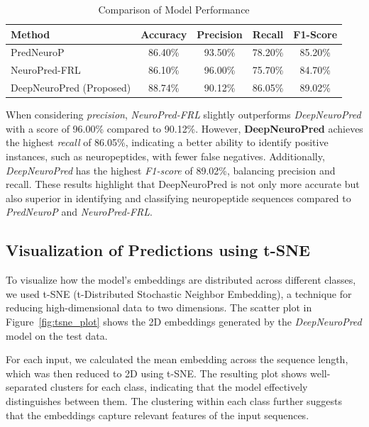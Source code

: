 \documentclass[conference]{IEEEtran}
\begin{document}
\begin{table}[h]
\centering
\renewcommand{\arraystretch}{1.5}
\begin{tabular}{lcccc}
\hline
\textbf{Method}      & \textbf{Accuracy} & \textbf{Precision} & \textbf{Recall} & \textbf{F1-Score} \\ \hline
PredNeuroP           & 86.40\%           & 93.50\%            & 78.20\%         & 85.20\%           \\
NeuroPred-FRL        & 86.10\%           & 96.00\%            & 75.70\%         & 84.70\%           \\
DeepNeuroPred (Proposed) & 88.74\%           & 90.12\%            & 86.05\%         & 89.02\%           \\ \hline
\end{tabular}
\vspace{.3em}
\caption{Comparison of Model Performance}
\label{table:comparison}
\end{table}

\vspace{-1em}
When considering \textit{precision}, \textit{NeuroPred-FRL} slightly outperforms \textit{DeepNeuroPred} with a score of 96.00\% compared to 90.12\%. However, \textbf{DeepNeuroPred} achieves the highest \textit{recall} of 86.05\%, indicating a better ability to identify positive instances, such as neuropeptides, with fewer false negatives. Additionally, \textit{DeepNeuroPred} has the highest \textit{F1-score} of 89.02\%, balancing precision and recall. These results highlight that DeepNeuroPred is not only more accurate but also superior in identifying and classifying neuropeptide sequences compared to \textit{PredNeuroP} and \textit{NeuroPred-FRL}.

\subsection{Visualization of Predictions using t-SNE}

To visualize how the model's embeddings are distributed across different classes, we used t-SNE (t-Distributed Stochastic Neighbor Embedding), a technique for reducing high-dimensional data to two dimensions. The scatter plot in Figure~\ref{fig:tsne_plot} shows the 2D embeddings generated by the \textit{DeepNeuroPred} model on the test data.

For each input, we calculated the mean embedding across the sequence length, which was then reduced to 2D using t-SNE. The resulting plot shows well-separated clusters for each class, indicating that the model effectively distinguishes between them. The clustering within each class further suggests that the embeddings capture relevant features of the input sequences.
\end{document}
